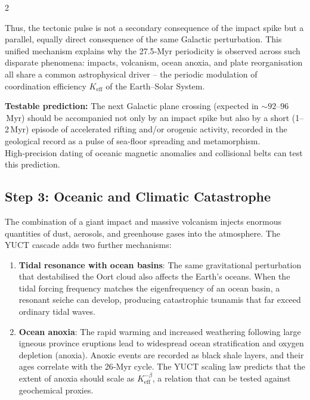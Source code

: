 \documentclass[11pt,a4paper]{article}
\begin{document}
	\begin{multicols}{2}
		
		Thus, the tectonic pulse is not a secondary consequence of the impact spike but a 
		parallel, equally direct consequence of the same Galactic perturbation.  
		This unified mechanism explains why the 27.5‑Myr periodicity is observed across 
		such disparate phenomena: impacts, volcanism, ocean anoxia, and plate reorganisation 
		all share a common astrophysical driver – the periodic modulation of coordination 
		efficiency \(K_{\mathrm{eff}}\) of the Earth–Solar System.
		
		\vspace{0.2cm}
		\noindent
		\textbf{Testable prediction:} The next Galactic plane crossing (expected in \(\sim 92\)–\(96\) Myr) 
		should be accompanied not only by an impact spike but also by a short (1–2 Myr) episode of 
		accelerated rifting and/or orogenic activity, recorded in the geological record as a 
		pulse of sea‑floor spreading and metamorphism.  High‑precision dating of oceanic magnetic 
		anomalies and collisional belts can test this prediction.
		
		\subsection{Step 3: Oceanic and Climatic Catastrophe}
		
		The combination of a giant impact and massive volcanism injects enormous 
		quantities of dust, aerosols, and greenhouse gases into the atmosphere. 
		The YUCT cascade adds two further mechanisms:
		\begin{enumerate}
			\item \textbf{Tidal resonance with ocean basins}: The same 
			gravitational perturbation that destabilised the Oort cloud also 
			affects the Earth’s oceans. When the tidal forcing frequency matches 
			the eigenfrequency of an ocean basin, a resonant seiche can develop, 
			producing catastrophic tsunamis that far exceed ordinary tidal waves.
			\item \textbf{Ocean anoxia}: The rapid warming and increased 
			weathering following large igneous province eruptions lead to 
			widespread ocean stratification and oxygen depletion (anoxia). 
			Anoxic events are recorded as black shale layers, and their ages 
			correlate with the 26‑Myr cycle. The YUCT scaling law predicts 
			that the extent of anoxia should scale as \(K_{\mathrm{eff}}^{-\beta}\), 
			a relation that can be tested against geochemical proxies.
		\end{enumerate}
		

\end{multicols}
\end{document}
